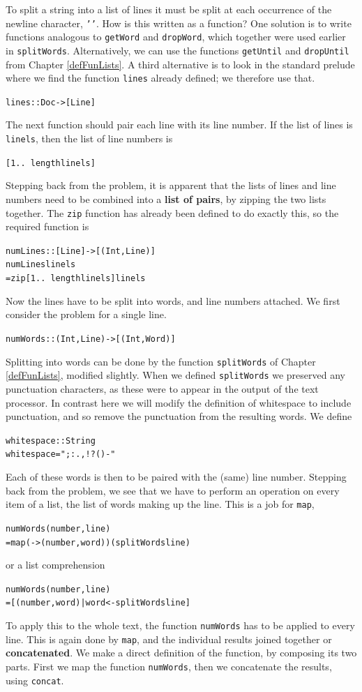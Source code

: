 To split a string into a list
of lines it must be split at each occurrence of the newline character,
\texttt{''}. How is this written as a function? One solution is to
write functions analogous to \texttt{getWord} and \texttt{dropWord}, which together
were used earlier in \texttt{splitWords}. Alternatively, we can use the
functions \texttt{getUntil} and \texttt{dropUntil} from Chapter \ref{defFunLists}. A
third alternative is to look in the standard prelude where we find the
function \texttt{lines} already defined; we therefore use that.
\begin{alltt}
lines :: Doc -> [Line]
\end{alltt}
The next function should pair each line with its line number. If the list of
lines is \texttt{linels}, then the list of line numbers is
\begin{alltt}
[1 ..\ length linels]
\end{alltt}
Stepping back from the problem, it is apparent that the lists of lines and
line numbers need to be combined into a \textbf{list of pairs}, by 
zipping the two lists together. The \texttt{zip}
function has already been
defined to do exactly this, so the required function is 
\begin{alltt}
numLines :: [Line] -> [ ( Int , Line ) ]
numLines linels
  = zip [1 ..\ length linels] linels
\end{alltt}
Now the lines have to be split into words, and line numbers attached. We
first consider the problem for a single line.
\begin{alltt}
numWords :: ( Int , Line ) -> [ ( Int , Word ) ]
\end{alltt}
Splitting into words can be done by the function \texttt{splitWords} of Chapter
\ref{defFunLists}, modified slightly. When we defined \texttt{splitWords} we preserved any punctuation
characters, as these were to appear in the output of the text processor. In contrast here we
will modify the definition of whitespace to include punctuation, and so remove the
punctuation from the resulting words. We define
\begin{alltt}
whitespace :: String
whitespace = " ;:.,!?()-"
\end{alltt}  
Each of these words is then to be paired with the (same) line
number. Stepping back from the problem, we see that we have to perform an
operation on every item of a list, the list of words making up the line. This
is a job for \texttt{map},
\begin{alltt}
numWords (number , line)
  = map ( -> (number,word)) (splitWords line)
\end{alltt}
or a list comprehension
\begin{alltt}
numWords (number , line)
  = [ (number , word) | word <- splitWords line ]
\end{alltt}
To apply this to the whole text,
the function \texttt{numWords} has to be applied to every line. This is again done
by \texttt{map}, and the individual results joined together or {\bf concatenated}.
We make a direct definition of the function, by composing its two parts. First
we map the function \texttt{numWords}, then we concatenate the results, using
\texttt{concat}.

